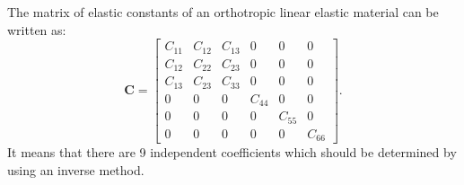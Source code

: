 \documentclass[preprint,12pt]{elsarticle}
\newcommand{\matr}[1]{\mathbf{#1}} %
\begin{document}
The matrix of elastic constants of an orthotropic linear elastic material can be written as:
\begin{equation}
	\matr{C} = \left[\begin{array}{cccccc} C_{11} & C_{12}& C_{13} & 0&0&0\\[2pt]
		C_{12}& C_{22} & C_{23}& 0&0&0\\[2pt]
		C_{13}&C_{23}&C_{33}&0&0&0\\[2pt]
		0& 0 &0&C_{44}& 0&0\\[2pt]
		0&0&0&0&C_{55}&0\\[2pt]
		0&0&0&0&0&C_{66}
	\end{array}\right]. 
	\label{eq:elastic_constatns}
\end{equation} 
It means that there are 9 independent coefficients which should be determined by using an inverse method. 
\end{document}

